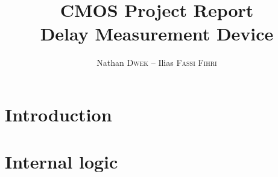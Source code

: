 
\title{CMOS Project Report\\Delay Measurement Device}
\author{Nathan \textsc{Dwek} -- Ilias \textsc{Fassi Fihri}}


\maketitle
\tableofcontents
\clearpage
\hypersetup{allcolors=link}
\section{Introduction}


\section{Internal logic}



